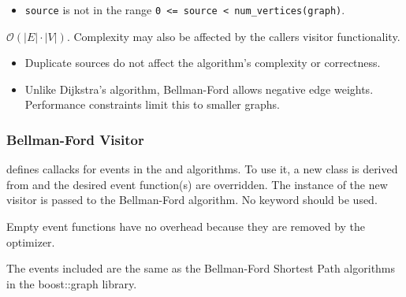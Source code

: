 \begin{itemdescr}
\begin{itemize}
\begin{itemize}
                              \item \lstinline{source} is not in the range \lstinline{0 <= source < num_vertices(graph)}.
                        \end{itemize}
            \end{itemize}
      \pnum\complexity $\mathcal{O}(|E| \cdot |V|)$. Complexity may also be affected by the callers visitor functionality. \\
      \pnum\remarks 
            \begin{itemize}
                  \item Duplicate sources do not affect the algorithm's complexity or correctness.
                  \item Unlike Dijkstra's algorithm, Bellman-Ford allows negative edge weights. 
                        Performance constraints limit this to smaller graphs.
            \end{itemize}
\end{itemdescr}


\subsubsection{Bellman-Ford Visitor}

 defines callacks for events in the 
and  algorithms. To use it, a new class is derived from 
 and the desired event function(s) are overridden. The instance of the
new visitor is passed to the Bellman-Ford algorithm. No  keyword should be used.

Empty event functions have no overhead because they are removed by the optimizer. 

The events included are the same as the Bellman-Ford Shortest Path algorithms in the boost::graph 
library.

{\small
      
}

